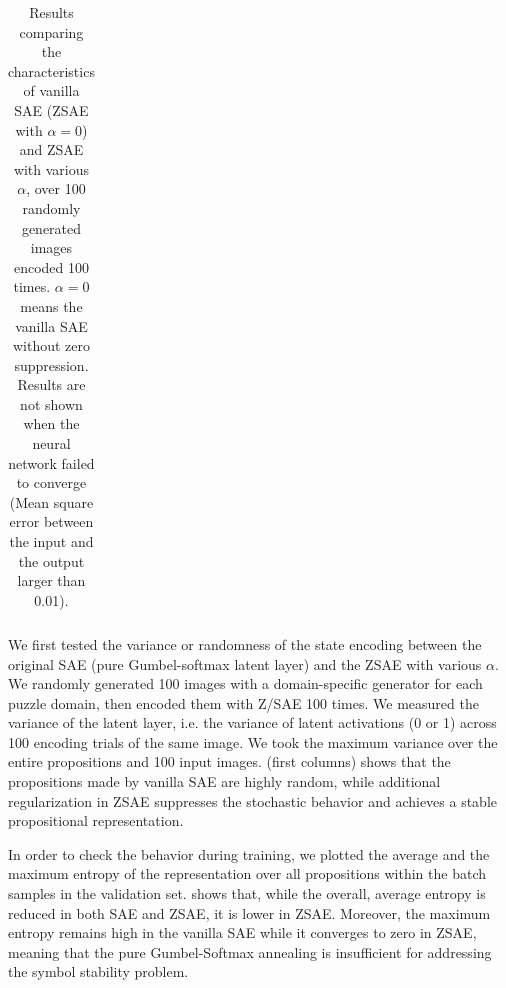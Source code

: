 \begin{table}[htbp]
\begin{tabular}{|r|*{3}{*{6}{c|}}}
\end{tabular}
 \caption{Results comparing the characteristics of vanilla SAE (ZSAE with $\alpha=0$) and ZSAE with various $\alpha$,
 over 100 randomly generated images encoded 100 times.
 $\alpha=0$ means the vanilla SAE without zero suppression.
 Results are not shown when the neural network failed to converge (Mean square error between the input and the output larger than 0.01).
 }
\label{tab:stability}
\end{table}



We first tested the variance or randomness of the state encoding between
the original SAE (pure Gumbel-softmax latent layer) and the ZSAE with various $\alpha$.
We randomly generated 100 images with a domain-specific generator for each puzzle domain,
then encoded them with Z/SAE 100 times.
We measured the variance of the latent layer, i.e. the variance of latent activations (0 or 1)
across 100 encoding trials of the same image.
We took the maximum variance over the entire propositions and 100 input images.
 (first columns) shows that the propositions made by vanilla SAE are highly random,
while additional regularization in ZSAE suppresses the stochastic behavior
and achieves a stable propositional representation.

In order to check the behavior during training, 
we plotted the average and the maximum entropy of the representation over all propositions
within the batch samples in the validation set.
% 
 shows that, while the overall, average entropy is reduced in both SAE and ZSAE,
it is lower in ZSAE. 
Moreover,
the maximum entropy remains high in the vanilla SAE while it converges to zero in ZSAE, meaning that
the pure Gumbel-Softmax annealing is insufficient for addressing the symbol stability problem.

